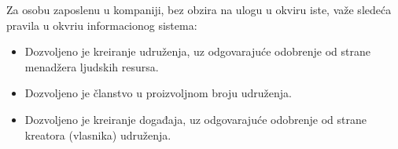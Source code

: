 \documentclass[a4paper]{article}
\begin{document}
Za osobu zaposlenu u kompaniji, bez obzira na ulogu u okviru iste, važe sledeća pravila u okvriu informacionog sistema:
\begin{itemize}
    \item Dozvoljeno je kreiranje udruženja, uz odgovarajuće odobrenje od strane menadžera ljudskih resursa.
    \item Dozvoljeno je članstvo u proizvoljnom broju udruženja.
    \item Dozvoljeno je kreiranje događaja, uz odgovarajuće odobrenje od strane kreatora (vlasnika) udruženja.
\end{itemize}
\end{document}

